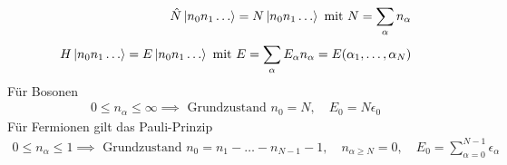 %
\begin{align*}
  \hat{N} \Ket{n_0 n_1 \ldots } = N \Ket{ n_0 n_1 \ldots} \text{ mit } N = 
  \sum_{\alpha}^{} n_\alpha \\
  H \Ket{n_0 n_1 \ldots} = E \Ket{n_0 n_1 \ldots } \text{ mit } E = 
  \sum_{\alpha}^{} E_\alpha n_\alpha = E (\alpha_1, \ldots , \alpha_N)
\end{align*}
%
F\"ur Bosonen 
%
\begin{align*}
  0 \le n_\alpha \le \infty \implies \text{ Grundzustand } n_0 = N, \quad
  E_0 = N \epsilon_0
\end{align*}
%
F\"ur Fermionen gilt das Pauli-Prinzip
%
\begin{align*}
  0 \le n_\alpha \le 1 \implies \text{ Grundzustand } n_0 = n_1 - \ldots - n_{N-1} -1,
  \quad n_{\alpha \ge N} = 0 , \quad E_0 = \sum_{\alpha=0}^{N-1} \epsilon_\alpha
\end{align*}
%
